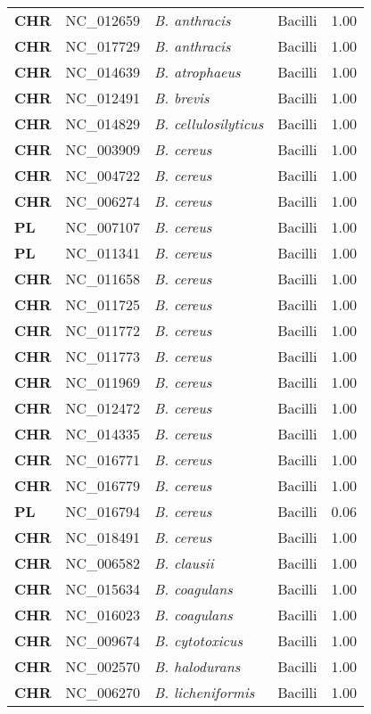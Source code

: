 \begin{adjustwidth}{-3cm}{2cm}
{\begin{supertabular}{>{\bfseries}l|p{0.1\textwidth}p{0.14\textwidth}l|l}
CHR & NC\_012659 & \textit{B. anthracis} & Bacilli & 1.00\\
CHR & NC\_017729 & \textit{B. anthracis} & Bacilli & 1.00\\
CHR & NC\_014639 & \textit{B. atrophaeus} & Bacilli & 1.00\\
CHR & NC\_012491 & \textit{B. brevis} & Bacilli & 1.00\\
CHR & NC\_014829 & \textit{B. cellulosilyticus} & Bacilli & 1.00\\
CHR & NC\_003909 & \textit{B. cereus} & Bacilli & 1.00\\
CHR & NC\_004722 & \textit{B. cereus} & Bacilli & 1.00\\
CHR & NC\_006274 & \textit{B. cereus} & Bacilli & 1.00\\
PL & NC\_007107 & \textit{B. cereus} & Bacilli & 1.00\\
PL & NC\_011341 & \textit{B. cereus} & Bacilli & 1.00\\
CHR & NC\_011658 & \textit{B. cereus} & Bacilli & 1.00\\
CHR & NC\_011725 & \textit{B. cereus} & Bacilli & 1.00\\
CHR & NC\_011772 & \textit{B. cereus} & Bacilli & 1.00\\
CHR & NC\_011773 & \textit{B. cereus} & Bacilli & 1.00\\
CHR & NC\_011969 & \textit{B. cereus} & Bacilli & 1.00\\
CHR & NC\_012472 & \textit{B. cereus} & Bacilli & 1.00\\
CHR & NC\_014335 & \textit{B. cereus} & Bacilli & 1.00\\
CHR & NC\_016771 & \textit{B. cereus} & Bacilli & 1.00\\
CHR & NC\_016779 & \textit{B. cereus} & Bacilli & 1.00\\
PL & NC\_016794 & \textit{B. cereus} & Bacilli & 0.06\\
CHR & NC\_018491 & \textit{B. cereus} & Bacilli & 1.00\\
CHR & NC\_006582 & \textit{B. clausii} & Bacilli & 1.00\\
CHR & NC\_015634 & \textit{B. coagulans} & Bacilli & 1.00\\
CHR & NC\_016023 & \textit{B. coagulans} & Bacilli & 1.00\\
CHR & NC\_009674 & \textit{B. cytotoxicus} & Bacilli & 1.00\\
CHR & NC\_002570 & \textit{B. halodurans} & Bacilli & 1.00\\
CHR & NC\_006270 & \textit{B. licheniformis} & Bacilli & 1.00\\

\end{supertabular}}
\end{adjustwidth}
